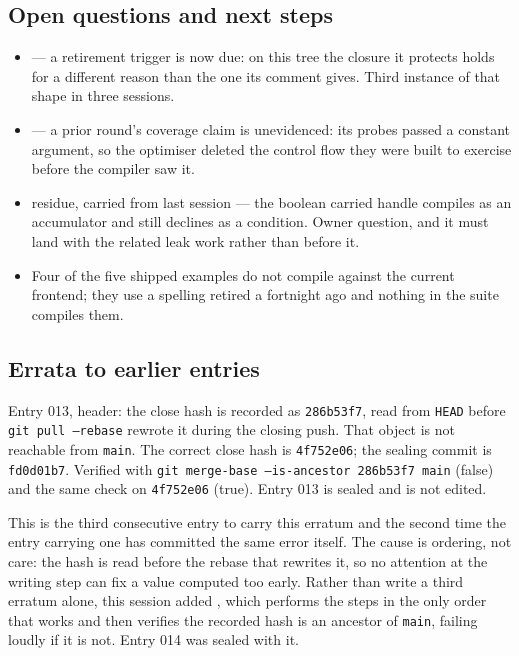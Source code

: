 \subsection*{Open questions and next steps}
\begin{itemize}
  \item {} --- a retirement trigger is now due: on this tree the closure it protects holds for
        a different reason than the one its comment gives. Third instance of that shape in three
        sessions.
  \item {} --- a prior round's coverage claim is unevidenced: its probes passed a constant
        argument, so the optimiser deleted the control flow they were built to exercise before the
        compiler saw it.
  \item {} residue, carried from last session --- the boolean carried handle compiles as an
        accumulator and still declines as a condition. Owner question, and it must land with the
        related leak work rather than before it.
  \item Four of the five shipped examples do not compile against the current frontend; they use a
        spelling retired a fortnight ago and nothing in the suite compiles them.
\end{itemize}

\subsection*{Errata to earlier entries}
Entry 013, header: the close hash is recorded as \texttt{286b53f7}, read from \texttt{HEAD} before
\texttt{git pull --rebase} rewrote it during the closing push. That object is not reachable from
\texttt{main}. The correct close hash is \texttt{4f752e06}; the sealing commit is \texttt{fd0d01b7}.
Verified with \texttt{git merge-base --is-ancestor 286b53f7 main} (false) and the same check on
\texttt{4f752e06} (true). Entry 013 is sealed and is not edited.

\medskip\noindent
This is the third consecutive entry to carry this erratum and the second time the entry carrying one
has committed the same error itself. The cause is ordering, not care: the hash is read before the
rebase that rewrites it, so no attention at the writing step can fix a value computed too early.
Rather than write a third erratum alone, this session added ,
which performs the steps in the only order that works and then verifies the recorded hash is an
ancestor of \texttt{main}, failing loudly if it is not. Entry 014 was sealed with it.
